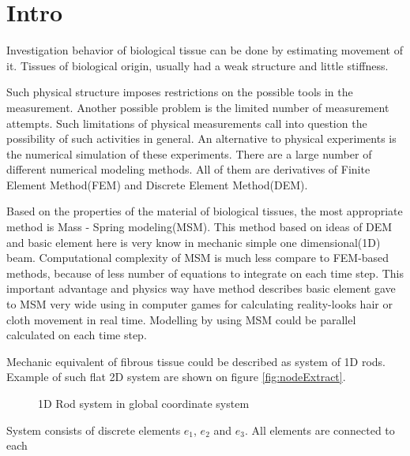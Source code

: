




\chapter*{Intro}
Investigation behavior of biological tissue can be done by estimating movement of it. Tissues of
biological origin, usually had a weak structure and little stiffness.
\par
Such physical structure imposes restrictions on the possible tools in the measurement. Another
possible problem is the limited number of measurement attempts. Such limitations of physical
measurements call into question the possibility of such activities in general. An alternative to
physical experiments is the numerical simulation of these experiments. There are a large number of
different numerical modeling methods. All of them are derivatives of Finite Element Method(FEM) and
Discrete Element Method(DEM).
\par
Based on the properties of the material of biological tissues, the most appropriate method is Mass -
Spring modeling(MSM). This method based on ideas of DEM and basic element here is very know in
mechanic simple one dimensional(1D) beam.
Computational complexity of MSM is much less compare to FEM-based methods, because of less number of
equations to integrate on each time step. This important advantage and physics way have method
describes basic element gave to MSM very wide using in computer games for calculating reality-looks
hair or cloth movement in real time. Modelling by using MSM could be parallel calculated on each
time step.\cite{Rasmusson2008} \cite{Amorim2012}
\par
Mechanic equivalent of fibrous tissue could be described as system of 1D rods. Example of such flat
2D system are shown on figure \ref{fig:nodeExtract}.
\begin{figure}[ht]
  \centering
      
  \caption{1D Rod system in global coordinate system}\label{fig:rodSystem}      
\end{figure} 
System consists of discrete elements $e_1$, $e_2$ and $e_3$. All elements are connected to each
